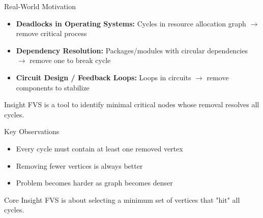 \documentclass[aspectratio=169]{beamer}
\begin{document}
\begin{frame}{Real-World Motivation}

	\begin{itemize}
		\item \textbf{Deadlocks in Operating Systems:} Cycles in resource allocation graph $\rightarrow$ remove critical process
		\item \textbf{Dependency Resolution:} Packages/modules with circular dependencies $\rightarrow$ remove one to break cycle
		\item \textbf{Circuit Design / Feedback Loops:} Loops in circuits $\rightarrow$ remove components to stabilize
	\end{itemize}

	\vspace{0.3cm}

	\begin{alertblock}{Insight}
		FVS is a tool to identify minimal critical nodes whose removal resolves all cycles.
	\end{alertblock}

\end{frame}

\begin{frame}{Key Observations}

	\begin{itemize}
		\item Every cycle must contain at least one removed vertex
		\item Removing fewer vertices is always better
		\item Problem becomes harder as graph becomes denser
	\end{itemize}

	\vspace{0.4cm}

	\begin{block}{Core Insight}
		FVS is about selecting a minimum set of vertices that "hit" all cycles.
	\end{block}

\end{frame}
\end{document}
